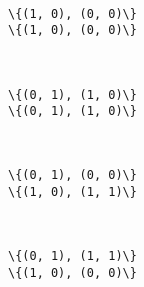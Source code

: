 \documentclass[11pt]{article}
\begin{document}
    \begin{center}
    \end{center}
    { \hspace*{\fill} \\}
    
    \begin{Verbatim}[commandchars=\\\{\}]
\{(1, 0), (0, 0)\}
\{(1, 0), (0, 0)\}

    \end{Verbatim}

    \begin{center}
    \end{center}
    { \hspace*{\fill} \\}
    
    \begin{Verbatim}[commandchars=\\\{\}]
\{(0, 1), (1, 0)\}
\{(0, 1), (1, 0)\}

    \end{Verbatim}

    \begin{center}
    \end{center}
    { \hspace*{\fill} \\}
    
    \begin{Verbatim}[commandchars=\\\{\}]
\{(0, 1), (0, 0)\}
\{(1, 0), (1, 1)\}

    \end{Verbatim}

    \begin{center}
    \end{center}
    { \hspace*{\fill} \\}
    
    \begin{Verbatim}[commandchars=\\\{\}]
\{(0, 1), (1, 1)\}
\{(1, 0), (0, 0)\}

    \end{Verbatim}

    \begin{center}
    \end{center}
    { \hspace*{\fill} \\}
    
\end{document}
